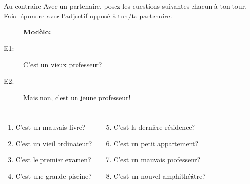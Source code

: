 \begin{frame}{Au contraire}
  Avec un partenaire, posez les questions suivantes chacun à ton tour.
  Fais répondre avec l'adjectif opposé à ton/ta partenaire. \\
  \begin{center}
    \begin{description}
      \item[] \textbf{Modèle:}
      \item[E1:] C'est un vieux professeur?
      \item[E2:] Mais non, c'est un jeune professeur!
    \end{description}
    \begin{columns}
        \begin{enumerate}
          \item C'est un mauvais livre?
          \item C'est un vieil ordinateur?
          \item C'est le premier examen?
          \item C'est une grande piscine?
        \end{enumerate}
        \begin{enumerate}
          \setcounter{enumi}{4}
          \item C'est la dernière résidence?
          \item C'est un petit appartement?
          \item C'est un mauvais professeur?
          \item C'est un nouvel amphithéâtre?
        \end{enumerate}
    \end{columns}
  \end{center}
\end{frame}